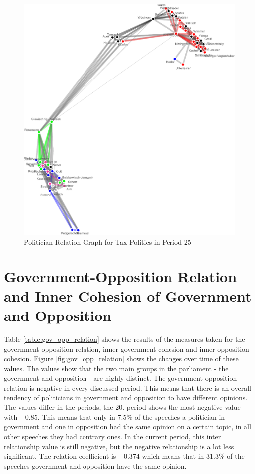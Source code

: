 \begin{figure}
\center
	\includegraphics[width=\textwidth]{imgs/graphs/graph_25_tax.eps}
	
	\caption{Politician Relation Graph for Tax Politics in Period 25}
	\label{fig:pol_graph_tax}
\end{figure}

\section{Government-Opposition Relation and Inner Cohesion of Government and Opposition}
\label{sec:gov_opp_relation}
Table \ref{table:gov_opp_relation} shows the results of the measures taken for the government-opposition relation, inner government cohesion and inner opposition cohesion. Figure \ref{fig:gov_opp_relation} shows the changes over time of these values. The values show that the two main groups in the parliament - the government and opposition - are highly distinct. The government-opposition relation is negative in every discussed period. This means that there is an overall tendency of politicians in government and opposition to have different opinions. The values differ in the periods, the 20. period shows the most negative value with $-0.85$. This means that only in $7.5$\% of the speeches a politician in government and one in opposition had the same opinion on a certain topic, in all other speeches they had contrary ones. In the current period, this inter relationship value is still negative, but the negative relationship is a lot less significant. The relation coefficient is $-0.374$ which means that in $31.3$\% of the speeches government and opposition have the same opinion.

